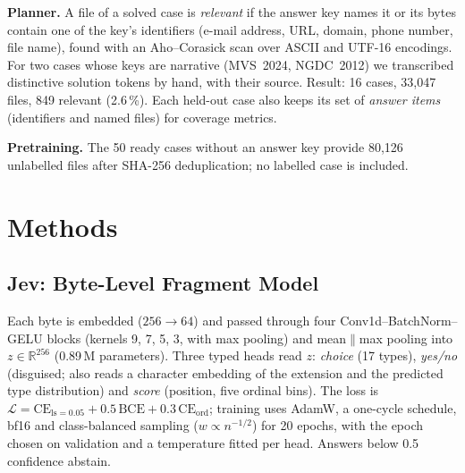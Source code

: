 \documentclass[conference]{IEEEtran}
\begin{document}
\textbf{Planner.} A file of a solved case is \emph{relevant} if the answer key names it or its bytes contain one of
the key's identifiers (e-mail address, URL, domain, phone number, file name), found with an Aho--Corasick scan over
ASCII and UTF-16 encodings. For two cases whose keys are narrative (MVS~2024, NGDC~2012) we transcribed distinctive
solution tokens by hand, with their source. Result: 16 cases, 33{,}047 files, 849 relevant (2.6\,\%). Each held-out
case also keeps its set of \emph{answer items} (identifiers and named files) for coverage metrics.

\textbf{Pretraining.} The 50 ready cases without an answer key provide 80{,}126 unlabelled files after SHA-256
deduplication; no labelled case is included.

\section{Methods}

\subsection{Jev: Byte-Level Fragment Model}\label{sec:jev}
Each byte is embedded ($256\!\to\!64$) and passed through four Conv1d--BatchNorm--GELU blocks (kernels 9, 7, 5, 3,
with max pooling) and mean$\|$max pooling into $z\in\mathbb{R}^{256}$ (0.89\,M parameters). Three typed heads read
$z$: \emph{choice} (17 types), \emph{yes/no} (disguised; also reads a character embedding of the extension and the
predicted type distribution) and \emph{score} (position, five ordinal bins). The loss is
$\mathcal{L}=\mathrm{CE}_{\text{ls}=0.05}+0.5\,\mathrm{BCE}+0.3\,\mathrm{CE}_{\text{ord}}$; training uses AdamW, a
one-cycle schedule, bf16 and class-balanced sampling ($w\propto n^{-1/2}$) for 20 epochs, with the epoch chosen on
validation and a temperature fitted per head. Answers below 0.5 confidence abstain.
\end{document}
